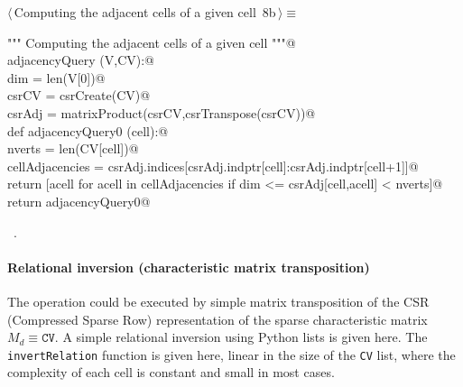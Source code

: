 \documentclass[11pt,oneside]{article}	%
\begin{document}
\begin{flushleft} \small \label{scrap6}
\protect{}$\langle\,$Computing the adjacent cells of a given cell\nobreak\ {\footnotesize 8b}$\,\rangle\equiv$
\vspace{-1ex}
\begin{list}{}{} \item
\mbox{}\verb@""" Computing the adjacent cells of a given cell """@\\
\mbox{}\verb@def adjacencyQuery (V,CV):@\\
\mbox{}\verb@   dim = len(V[0])@\\
\mbox{}\verb@   csrCV =  csrCreate(CV)@\\
\mbox{}\verb@   csrAdj = matrixProduct(csrCV,csrTranspose(csrCV))@\\
\mbox{}\verb@   def adjacencyQuery0 (cell):@\\
\mbox{}\verb@      nverts = len(CV[cell])@\\
\mbox{}\verb@      cellAdjacencies = csrAdj.indices[csrAdj.indptr[cell]:csrAdj.indptr[cell+1]]@\\
\mbox{}\verb@      return [acell for acell in cellAdjacencies if dim <= csrAdj[cell,acell] < nverts]@\\
\mbox{}\verb@   return adjacencyQuery0@\\
\mbox{}\verb@@{\NWsep}
\end{list}
\vspace{-1ex}
\footnotesize\addtolength{\baselineskip}{-1ex}
\begin{list}{}{\setlength{\itemsep}{-\parsep}\setlength{\itemindent}{-\leftmargin}}
\item \NWtxtMacroRefIn\ .
\end{list}
\end{flushleft}


\paragraph{Relational inversion (characteristic matrix transposition)}

The operation could be executed by simple matrix transposition of the CSR (Compressed Sparse Row) representation of the sparse characteristic matrix $M_d \equiv \texttt{CV}$.
A simple relational inversion using Python lists is given here. The \texttt{invertRelation} function 
is given here, linear in the size of the \texttt{CV} list, where the complexity of each cell is constant and 
small in most cases.
\end{document}

